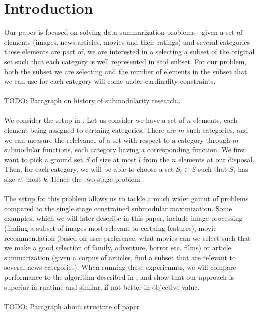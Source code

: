 \section{Introduction}
\label{sec::intro}

Our paper is focused on solving data summarization problems - given a set of elements (images, news articles, movies and their ratings) and several categories these elements are part of, we are interested in a selecting a subset of the original set such that each category is well represented in said subset. For our problem, both the subset we are selecting and the number of elements in the subset that we can use for each category will come under cardinality constraints. \\
\\
TODO: Paragraph on history of submodularity research.. \\
\\
We consider the setup in \cite{balkanski16learning}. Let us consider we have a set of $n$ elements, each element being assigned to certaing categories. There are $m$ such categories, and we can measure the relelvance of a set with respect to a category through $m$ submodular functions, each category having a corresponding function. We first want to pick a ground set $S$ of size at most $l$ from the $n$ elements at our disposal. Then, for each category, we will be able to choose a set $S_i \subset S$ such that $S_i$ has size at most $k$. Hence the two stage problem. \\
\\
The setup for this problem allows us to tackle a much wider gamut of problems compared to the single stage constrained submodular maximization. Some examples, which we will later describe in this paper, include image processing (finding a subset of images most relevant to certaing features), movie recommendation (based on user preference, what movies can we select such that we make a good selection of family, adventure, horror etc. films) or article summarization (given a corpus of articles, find a subset that are relevant to several news categories). When running these experiemnts, we will compare performance to the algorithm described in \cite{balkanski16learning}, and show that our approach is superior in runtime and similar, if not better in objective value. \\
\\
TODO: Paragraph about structure of paper 

